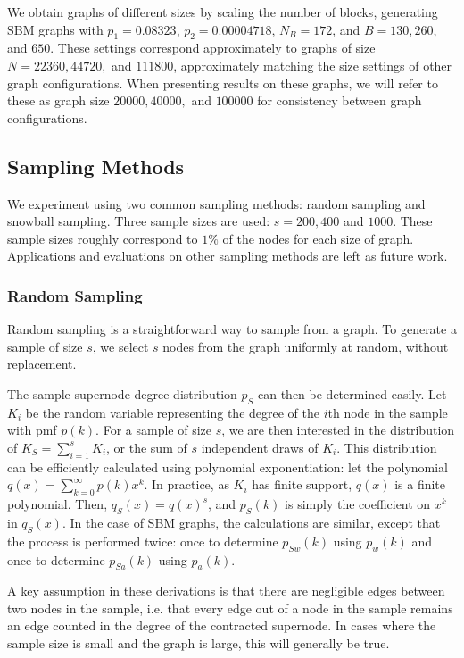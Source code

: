 We obtain graphs of different sizes by scaling the number of blocks,  generating SBM graphs with $p_1=0.08323$, $p_2=0.00004718$, $N_B = 172$, and $B = 130, 260,$ and $650$. These settings correspond approximately to graphs of size $N = 22360, 44720,$ and $111800$, approximately matching the size settings of other graph configurations. When presenting results on these graphs, we will refer to these as graph size $20000, 40000,$ and $100000$ for consistency between graph configurations.

\subsection{Sampling Methods}
\label{sec:sampling_methods}

We experiment using two common sampling methods: random sampling and snowball sampling. Three sample sizes are used: $s=200, 400$ and $1000$. These sample sizes roughly correspond to $1\%$ of the nodes for each size of graph. Applications and evaluations on other sampling methods are left as future work.

\subsubsection{Random Sampling}

Random sampling is a straightforward way to sample from a graph. To generate a sample of size $s$, we select $s$ nodes from the graph uniformly at random, without replacement.

The sample supernode degree distribution $p_S$ can then be determined easily.
Let $K_i$ be the random variable representing the degree of the $i$th node in the sample with pmf $p(k)$.
For a sample of size $s$, we are then interested in the distribution of $K_S = \sum_{i=1}^s K_i$, or the sum of $s$ independent draws of $K_i$. This distribution can be efficiently calculated using polynomial exponentiation: let the polynomial $q(x) = \sum_{k=0}^\infty p(k) x^k$. 
In practice, as $K_i$ has finite support, $q(x)$ is a finite polynomial. Then, $q_S(x) = q(x)^s$, and $p_S(k)$ is simply the coefficient on $x^k$ in $q_S(x)$.
In the case of SBM graphs, the calculations are similar, except that the process is performed twice: once to determine $p_{Sw}(k)$ using $p_w(k)$ and once to determine $p_{Sa}(k)$ using $p_a(k)$.

A key assumption in these derivations is that there are negligible edges between two nodes in the sample, i.e. that every edge out of a node in the sample remains an edge counted in the degree of the contracted supernode. In cases where the sample size is small and the graph is large, this will generally be true.


